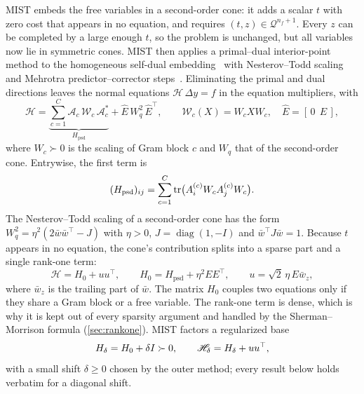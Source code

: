 MIST embeds the free variables in a second-order cone: it adds a scalar $t$ with
zero cost that appears in no equation, and requires $(t,z)\in\mathcal Q^{n_f+1}$.
Every $z$ can be completed by a large enough $t$, so the problem is unchanged, but
all variables now lie in symmetric cones. MIST then applies a primal--dual
interior-point method to the homogeneous self-dual
embedding~\cite{ye1994homogeneous} with Nesterov--Todd
scaling~\cite{nesterov1997self,todd1998nesterov} and Mehrotra
predictor--corrector steps~\cite{mehrotra1992implementation}. Eliminating the
primal and dual directions leaves the normal equations $\mathscr H\,\Delta y=f$ in
the equation multipliers, with
\begin{equation}\label{eq:normal}
\mathscr H=\underbrace{\sum_{c=1}^{C}\mathcal A_c\,\mathcal W_c\,\mathcal A_c^{*}}_{H_{\mathrm{psd}}}
+\widehat E\,W_q^2\,\widehat E^{\top},
\qquad \mathcal W_c(X)=W_cXW_c,\quad \widehat E=[\,0\ \ E\,],
\end{equation}
where $W_c\succ0$ is the scaling of Gram block $c$ and $W_q$ that of the
second-order cone. Entrywise, the first term is
\begin{equation}\label{eq:schur}
(H_{\mathrm{psd}})_{ij}=\sum_{c=1}^{C}\operatorname{tr}\bigl(A_i^{(c)}W_cA_j^{(c)}W_c\bigr).
\end{equation}
The Nesterov--Todd scaling of a second-order cone has the form
$W_q^2=\eta^2(2\bar w\bar w^\top-J)$ with $\eta>0$, $J=\operatorname{diag}(1,-I)$
and $\bar w^\top J\bar w=1$. Because $t$ appears in no equation, the cone's
contribution splits into a sparse part and a single rank-one term:
\begin{equation}\label{eq:operator}
\mathscr H=H_0+uu^\top,\qquad H_0=H_{\mathrm{psd}}+\eta^2EE^\top,\qquad
u=\sqrt2\,\eta\,E\bar w_z,
\end{equation}
where $\bar w_z$ is the trailing part of $\bar w$. The matrix $H_0$ couples two
equations only if they share a Gram block or a free variable. The rank-one term is
dense, which is why it is kept out of every sparsity argument and handled by the
Sherman--Morrison formula (\cref{sec:rankone}). MIST factors a regularized base
\begin{equation}\label{eq:shift}
H_\delta=H_0+\delta I\succ0,\qquad \mathscr H_\delta=H_\delta+uu^\top,
\end{equation}
with a small shift $\delta\ge0$ chosen by the outer method; every result below
holds verbatim for a diagonal shift.

